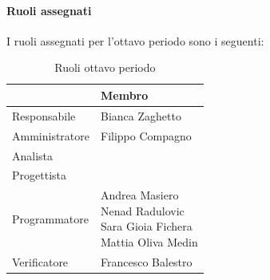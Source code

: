 \documentclass[a4paper,12pt]{article}
\begin{document}
            \paragraph{Ruoli assegnati}
            I ruoli assegnati per l'ottavo periodo sono i seguenti:
                \begin{table}[H]
                \centering
                \caption{Ruoli ottavo periodo}
                \begin{tabular}{|l|l|}
                \hline
                    \rowcolor{lightgray}{\textbf{Ruolo}} & {\textbf{Membro}} \\
                \hline
                    Responsabile & Bianca Zaghetto  \\
                \hline
                    Amministratore & Filippo Compagno  \\
                \hline
                    Analista &  \\
                \hline
                    Progettista &  \\
                \hline
                    Programmatore & \makecell[l]{ Andrea Masiero \\ Nenad Radulovic \\ Sara Gioia Fichera \\ Mattia Oliva Medin} \\
                \hline
                    Verificatore & Francesco Balestro \\
                \hline
                \end{tabular}
                \end{table}
                
\end{document}
